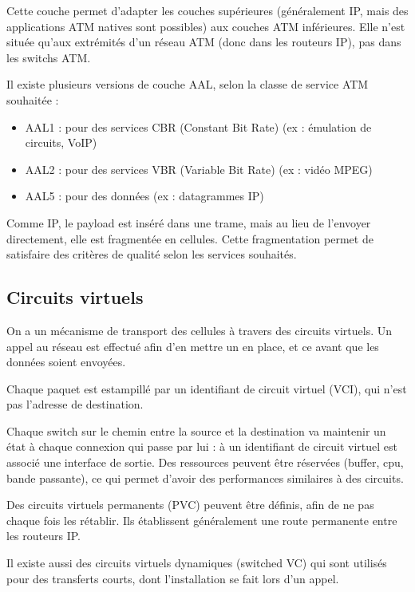 		Cette couche permet d'adapter les couches supérieures (généralement IP, mais des applications ATM natives sont possibles) aux couches ATM inférieures. Elle n'est située qu'aux extrémités d'un réseau ATM (donc dans les routeurs IP), pas dans les switchs ATM.
	
	
		Il existe plusieurs versions de couche AAL, selon la classe de service ATM souhaitée :
		
		\begin{itemize}
			\item AAL1 : pour des services CBR (Constant Bit Rate) (ex : émulation de circuits, VoIP)
			\item AAL2 : pour des services VBR (Variable Bit Rate) (ex : vidéo MPEG)
			\item AAL5 : pour des données (ex : datagrammes IP)
		\end{itemize}
		
	
	Comme IP, le payload est inséré dans une trame, mais au lieu de l'envoyer directement, elle est fragmentée en cellules. Cette fragmentation permet de satisfaire des critères de qualité selon les services souhaités.
	
	
		\subsection{Circuits virtuels}
		
		On a un mécanisme de transport des cellules à travers des circuits virtuels. Un appel au réseau est effectué afin d'en mettre un en place, et ce avant que les données soient envoyées.
		
		Chaque paquet est estampillé par un identifiant de circuit virtuel (VCI), qui n'est pas l'adresse de destination.
		
		Chaque switch sur le chemin entre la source et la destination va maintenir un état à chaque connexion qui passe par lui : à un identifiant de circuit virtuel est associé une interface de sortie. Des ressources peuvent être réservées (buffer, cpu, bande passante), ce qui permet d'avoir des performances similaires à des circuits.
	
	Des circuits virtuels permanents (PVC) peuvent être définis, afin de ne pas chaque fois les rétablir. Ils établissent généralement une route permanente entre les routeurs IP.	
	
	Il existe aussi des circuits virtuels dynamiques (switched VC) qui sont utilisés pour des transferts courts, dont l'installation se fait lors d'un appel.
	
